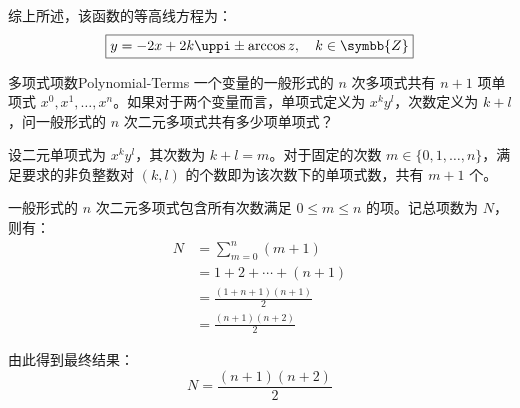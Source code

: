 \begin{solution}
    \begin{center}
    \end{center}
    综上所述，该函数的等高线方程为：
    \begin{equation}
        \boxed{y = -2x + 2k\uppi \pm \arccos z, \quad k \in \symbb{Z}}
    \end{equation}
\end{solution}


\begin{problem}{多项式项数}{Polynomial-Terms}
    一个变量的一般形式的 $n$ 次多项式共有 $n+1$ 项单项式 $x^0, x^1, \dots, x^n$。如果对于两个变量而言，单项式定义为 $x^k y^l$，次数定义为 $k+l$，问一般形式的 $n$ 次二元多项式共有多少项单项式？
\end{problem}

\begin{solution}
    设二元单项式为 $x^k y^l$，其次数为 $k+l = m$。对于固定的次数 $m \in \{0, 1, \dots, n\}$，满足要求的非负整数对 $(k, l)$ 的个数即为该次数下的单项式数，共有 $m+1$ 个。

    一般形式的 $n$ 次二元多项式包含所有次数满足 $0 \le m \le n$ 的项。记总项数为 $N$，则有：
    \begin{equation}
        \begin{aligned}
            N & = \sum_{m=0}^{n} (m+1)         \\
              & = 1 + 2 + \cdots + (n+1)       \\
              & = \frac{(1 + n + 1)(n + 1)}{2} \\
              & = \frac{(n+1)(n+2)}{2}
        \end{aligned}
    \end{equation}

    由此得到最终结果：
    \begin{equation}
        \boxed{N = \frac{(n+1)(n+2)}{2}}
    \end{equation}
\end{solution}


